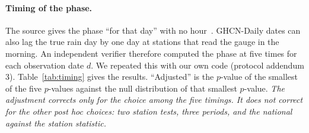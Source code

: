 \documentclass[11pt]{article}
\begin{document}
\paragraph{Timing of the phase.} The source gives the phase ``for that day'' with no hour~\cite[para.~11]{cerveny2010}. GHCN-Daily dates can also lag the true rain day by one day at stations that read the gauge in the morning. An independent verifier therefore computed the phase at five times for each observation date $d$. We repeated this with our own code (protocol addendum 3). Table~\ref{tab:timing} gives the results. ``Adjusted'' is the $p$-value of the smallest of the five $p$-values against the null distribution of that smallest $p$-value. \emph{The adjustment corrects only for the choice among the five timings. It does not correct for the other post hoc choices: two station tests, three periods, and the national against the station statistic.}
\end{document}

